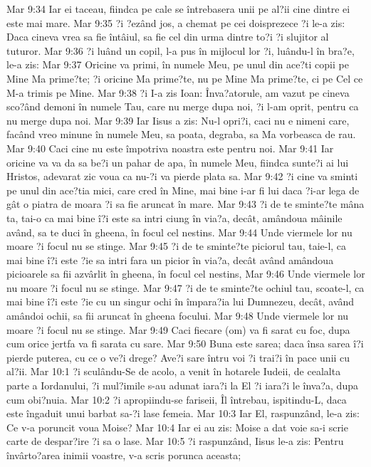 Mar 9:34  Iar ei taceau, fiindca pe cale se întrebasera unii pe al?ii cine dintre ei este mai mare.
Mar 9:35  ?i ?ezând jos, a chemat pe cei doisprezece ?i le-a zis: Daca cineva vrea sa fie întâiul, sa fie cel din urma dintre to?i ?i slujitor al tuturor.
Mar 9:36  ?i luând un copil, l-a pus în mijlocul lor ?i, luându-l în bra?e, le-a zis:
Mar 9:37  Oricine va primi, în numele Meu, pe unul din ace?ti copii pe Mine Ma prime?te; ?i oricine Ma prime?te, nu pe Mine Ma prime?te, ci pe Cel ce M-a trimis pe Mine.
Mar 9:38  ?i I-a zis Ioan: Înva?atorule, am vazut pe cineva sco?ând demoni în numele Tau, care nu merge dupa noi, ?i l-am oprit, pentru ca nu merge dupa noi.
Mar 9:39  Iar Iisus a zis: Nu-l opri?i, caci nu e nimeni care, facând vreo minune în numele Meu, sa poata, degraba, sa Ma vorbeasca de rau.
Mar 9:40  Caci cine nu este împotriva noastra este pentru noi.
Mar 9:41  Iar oricine va va da sa be?i un pahar de apa, în numele Meu, fiindca sunte?i ai lui Hristos, adevarat zic voua ca nu-?i va pierde plata sa.
Mar 9:42  ?i cine va sminti pe unul din ace?tia mici, care cred în Mine, mai bine i-ar fi lui daca ?i-ar lega de gât o piatra de moara ?i sa fie aruncat în mare.
Mar 9:43  ?i de te sminte?te mâna ta, tai-o ca mai bine î?i este sa intri ciung în via?a, decât, amândoua mâinile având, sa te duci în gheena, în focul cel nestins.
Mar 9:44  Unde viermele lor nu moare ?i focul nu se stinge.
Mar 9:45  ?i de te sminte?te piciorul tau, taie-l, ca mai bine î?i este ?ie sa intri fara un picior în via?a, decât având amândoua picioarele sa fii azvârlit în gheena, în focul cel nestins,
Mar 9:46  Unde viermele lor nu moare ?i focul nu se stinge.
Mar 9:47  ?i de te sminte?te ochiul tau, scoate-l, ca mai bine î?i este ?ie cu un singur ochi în împara?ia lui Dumnezeu, decât, având amândoi ochii, sa fii aruncat în gheena focului.
Mar 9:48  Unde viermele lor nu moare ?i focul nu se stinge.
Mar 9:49  Caci fiecare (om) va fi sarat cu foc, dupa cum orice jertfa va fi sarata cu sare.
Mar 9:50  Buna este sarea; daca însa sarea î?i pierde puterea, cu ce o ve?i drege? Ave?i sare întru voi ?i trai?i în pace unii cu al?ii.
Mar 10:1  ?i sculându-Se de acolo, a venit în hotarele Iudeii, de cealalta parte a Iordanului, ?i mul?imile s-au adunat iara?i la El ?i iara?i le înva?a, dupa cum obi?nuia.
Mar 10:2  ?i apropiindu-se fariseii, Îl întrebau, ispitindu-L, daca este îngaduit unui barbat sa-?i lase femeia.
Mar 10:3  Iar El, raspunzând, le-a zis: Ce v-a poruncit voua Moise?
Mar 10:4  Iar ei au zis: Moise a dat voie sa-i scrie carte de despar?ire ?i sa o lase.
Mar 10:5  ?i raspunzând, Iisus le-a zis: Pentru învârto?area inimii voastre, v-a scris porunca aceasta;
